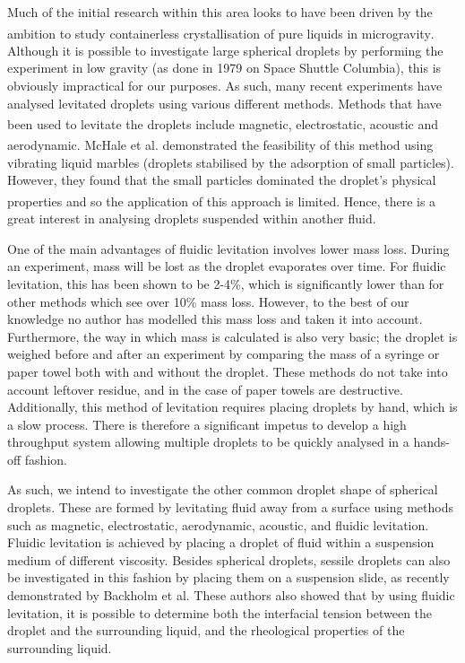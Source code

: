 \documentclass{physics_article_B}
\begin{document}
    Much of the initial research within this area looks to have been driven by the ambition to study containerless crystallisation of pure liquids in microgravity\textsuperscript{\cite{wilkes}}. Although it is possible to investigate large spherical droplets by performing the experiment in low gravity (as done in 1979\cite{holt} on Space Shuttle Columbia), this is obviously impractical for our purposes. As such, many recent experiments have analysed levitated droplets using various different methods. Methods that have been used to levitate the droplets include magnetic\textsuperscript{\cite{hill}}, electrostatic\textsuperscript{\cite{mugele}}, acoustic\textsuperscript{\cite{trinh}} and aerodynamic\textsuperscript{\cite{benmore}}. McHale et al. demonstrated the feasibility of this method using vibrating liquid marbles (droplets stabilised by the adsorption of small particles). However, they found that the small particles dominated the droplet's physical properties and so the application of this approach is limited\textsuperscript{\cite{mchale}}. Hence, there is a great interest in analysing droplets suspended within another fluid. 
    
    One of the main advantages of fluidic levitation involves lower mass loss. During an experiment, mass will be lost as the droplet evaporates over time. For fluidic levitation, this has been shown to be 2-4\%, which is significantly lower than for other methods which see over 10\% \cite{harrold2} mass loss. However, to the best of our knowledge no author has modelled this mass loss and taken it into account. Furthermore, the way in which mass is calculated is also very basic; the droplet is weighed before and after an experiment by comparing the mass of a syringe or paper towel both with and without the droplet. These methods do not take into account leftover residue, and in the case of paper towels are destructive. Additionally, this method of levitation requires placing droplets by hand, which is a slow process. There is therefore a significant impetus to develop a high throughput system allowing multiple droplets to be quickly analysed in a hands-off fashion.
    
    As such, we intend to investigate the other common droplet shape of spherical droplets. These are formed by levitating fluid away from a surface using methods such as magnetic\cite{temperton, hill}, electrostatic\cite{mugele, wong}, aerodynamic\cite{benmore}, acoustic\cite{Temperton2012, Yarin1998}, and fluidic levitation. Fluidic levitation is achieved by placing a droplet of fluid within a suspension medium of different viscosity. Besides spherical droplets, sessile droplets can also be investigated in this fashion by placing them on a suspension slide, as recently demonstrated by Backholm et al\cite{Backholm2017}. These authors also showed that\cite{Backholm2017} by using fluidic levitation, it is possible to determine both the interfacial tension between the droplet and the surrounding liquid, and the rheological properties of the surrounding liquid. %
\end{document}
